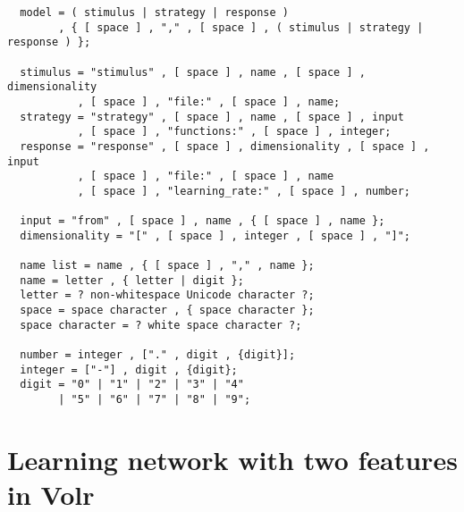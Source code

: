 \documentclass[a4paper,oneside]{memoir}
\begin{document}
\begin{verbatim}
  model = ( stimulus | strategy | response )
        , { [ space ] , "," , [ space ] , ( stimulus | strategy | response ) };

  stimulus = "stimulus" , [ space ] , name , [ space ] , dimensionality
           , [ space ] , "file:" , [ space ] , name;
  strategy = "strategy" , [ space ] , name , [ space ] , input
           , [ space ] , "functions:" , [ space ] , integer;
  response = "response" , [ space ] , dimensionality , [ space ] , input
           , [ space ] , "file:" , [ space ] , name
           , [ space ] , "learning_rate:" , [ space ] , number;

  input = "from" , [ space ] , name , { [ space ] , name };
  dimensionality = "[" , [ space ] , integer , [ space ] , "]";

  name list = name , { [ space ] , "," , name };
  name = letter , { letter | digit };
  letter = ? non-whitespace Unicode character ?;
  space = space character , { space character };
  space character = ? white space character ?;

  number = integer , ["." , digit , {digit}];
  integer = ["-"] , digit , {digit};
  digit = "0" | "1" | "2" | "3" | "4"
        | "5" | "6" | "7" | "8" | "9";
\end{verbatim}

\clearpage

\appendix
\chapter{Learning network with two features in Volr}



\clearpage
\end{document}
